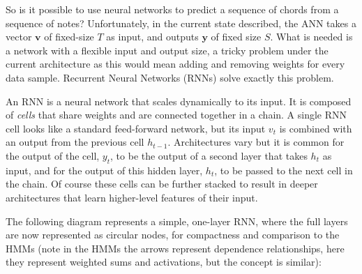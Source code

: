 \documentclass[bsc,singlespacing,logo, parskip, deptreport]{infthesis}
\begin{document}
So is it possible to use neural networks to predict a sequence of chords from a sequence of notes? Unfortunately, in the current state described, the ANN takes a vector $\bm{v}$ of fixed-size $T$ as input, and outputs $\bm{y}$ of fixed size $S$. What is needed is a network with a flexible input and output size, a tricky problem under the current architecture as this would mean adding and removing weights for every data sample. Recurrent Neural Networks (RNNs) solve exactly this problem.

An RNN is a neural network that scales dynamically to its input. It is composed of {\em cells} that share weights and are connected together in a chain. A single RNN cell looks like a standard feed-forward network, but its input $v_t$ is combined with an output from the previous cell $h_{t-1}$. Architectures vary but it is common for the output of the cell, $y_t$, to be the output of a second layer that takes $h_t$ as input, and for the output of this hidden layer, $h_t$, to be passed to the next cell in the chain. Of course these cells can be further stacked to result in deeper architectures that learn higher-level features of their input.

The following diagram represents a simple, one-layer RNN, where the full layers are now represented as circular nodes, for compactness and comparison to the HMMs (note in the HMMs the arrows represent dependence relationships, here they represent weighted sums and activations, but the concept is similar):

\begin{center}
\end{center}
\end{document}
